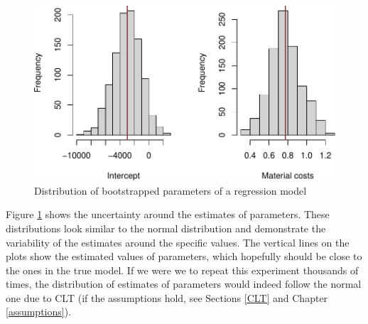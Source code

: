 \documentclass[
]{book}
\newenvironment{Shaded}{\begin{snugshade}}{\end{snugshade}}
\newcommand{\AttributeTok}[1]{\textcolor[rgb]{0.13,0.29,0.53}{#1}}
\newcommand{\CommentTok}[1]{\textcolor[rgb]{0.56,0.35,0.01}{\textit{#1}}}
\newcommand{\DecValTok}[1]{\textcolor[rgb]{0.00,0.00,0.81}{#1}}
\newcommand{\FunctionTok}[1]{\textcolor[rgb]{0.13,0.29,0.53}{\textbf{#1}}}
\newcommand{\NormalTok}[1]{#1}
\newcommand{\SpecialCharTok}[1]{\textcolor[rgb]{0.81,0.36,0.00}{\textbf{#1}}}
\newcommand{\StringTok}[1]{\textcolor[rgb]{0.31,0.60,0.02}{#1}}
\theoremstyle{definition}
\theoremstyle{definition}
\theoremstyle{definition}
\theoremstyle{definition}
\theoremstyle{remark}
\begin{document}
\begin{Shaded}
\end{Shaded}

\begin{figure}
\centering
\includegraphics{Svetunkov---Statistics-for-Business-Analytics_files/figure-latex/costsModelMLRBootstrap-1.pdf}
\caption{\label{fig:costsModelMLRBootstrap}Distribution of bootstrapped parameters of a regression model}
\end{figure}

Figure \ref{fig:costsModelMLRBootstrap} shows the uncertainty around the estimates of parameters. These distributions look similar to the normal distribution and demonstrate the variability of the estimates around the specific values. The vertical lines on the plots show the estimated values of parameters, which hopefully should be close to the ones in the true model. If we were we to repeat this experiment thousands of times, the distribution of estimates of parameters would indeed follow the normal one due to CLT (if the assumptions hold, see Sections \ref{CLT} and Chapter \ref{assumptions}).
\end{document}
